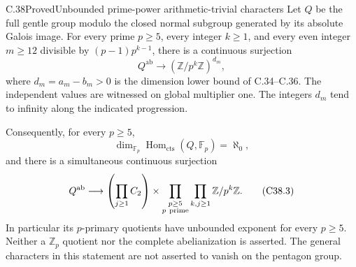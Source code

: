 \begin{statement}{C.38}{Proved}{Unbounded prime-power arithmetic-trivial characters}
Let \(Q\) be the full gentle group modulo the closed normal
subgroup generated by its absolute Galois image.
For every prime \(p\geq5\), every integer \(k\geq1\), and every
even integer \(m\geq12\) divisible by \((p-1)p^{k-1}\), there is
a continuous surjection
\[
                  Q^{\mathrm{ab}}\longrightarrow
                       (\mathbb Z/p^k\mathbb Z)^{d_m},
                                                               \tag{C38.1}
\]
where \(d_m=a_m-b_m>0\) is the dimension lower bound of
C.34--C.36.  The independent values are witnessed on global
multiplier one.  The integers \(d_m\) tend to infinity along
the indicated progression.

Consequently, for every \(p\geq5\),
\[
 \dim_{\mathbb F_p}\operatorname{Hom}_{\mathrm{cts}}
                         (Q,\mathbb F_p)=\aleph_0,
                                                               \tag{C38.2}
\]
and there is a simultaneous continuous surjection
\[
 Q^{\mathrm{ab}}\longrightarrow
       \left(\prod_{j\geq1}C_2\right)
       \times
       \prod_{\substack{p\geq5\\p\ {\rm prime}}}
             \prod_{k,j\geq1}\mathbb Z/p^k\mathbb Z .
                                                               \tag{C38.3}
\]
In particular its \(p\)-primary quotients have unbounded
exponent for every \(p\geq5\).  Neither a
\(\mathbb Z_p\) quotient nor the complete abelianization is
asserted.  The general characters in this statement are not
asserted to vanish on the pentagon group.
\end{statement}
